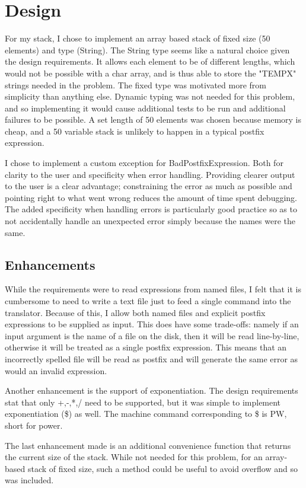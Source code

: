 \documentclass[a4paper,12pt]{article}
\begin{document}
\section*{Design}
For my stack, I chose to implement an array based stack of fixed size (50 elements) and type (String).  The String type seems
like a natural choice given the design requirements.  It allows each element to be of different lengths, which would not be possible
with a char array, and is thus able to store the "TEMPX" strings needed in the problem.  The fixed type was motivated more from 
simplicity than anything else.  Dynamic typing was not needed for this problem, and so implementing it would cause additional tests
to be run and additional failures to be possible.  A set length of 50 elements was chosen because memory is cheap, and a 50 
variable stack is unlikely to happen in a typical postfix expression.

I chose to implement a custom exception for BadPostfixExpression.  Both for clarity to the user and specificity when error handling.  
Providing clearer output to the user is a clear advantage; constraining the error as much as possible and pointing right to what went
wrong reduces the amount of time spent debugging.  The added specificity when handling errors is particularly good practice
so as to not accidentally handle an unexpected error simply because the names were the same. 

\subsection*{Enhancements}
While the requirements were to read expressions from named files, I felt that it is cumbersome to need to write a text
file just to feed a single command into the translator.  Because of this, I allow both named files and explicit postfix expressions to be 
supplied as input.  This does have some trade-offs: namely if an input argument is the name of a file on the disk, then it 
will be read line-by-line, otherwise it will be treated as a single postfix expression.  This means that an incorrectly spelled file
will be read as postfix and will generate the same error as would an invalid expression. 

Another enhancement is the support of exponentiation.  The design requirements stat that only +,-,*,/ need to be supported,
but it was simple to implement exponentiation (\$) as well.  The machine command corresponding to \$ is PW, short for power.  

The last enhancement made is an additional convenience function that returns the current size of the stack.  While not needed
for this problem, for an array-based stack of fixed size, such a method could be useful to avoid overflow and so was included.
\end{document}

